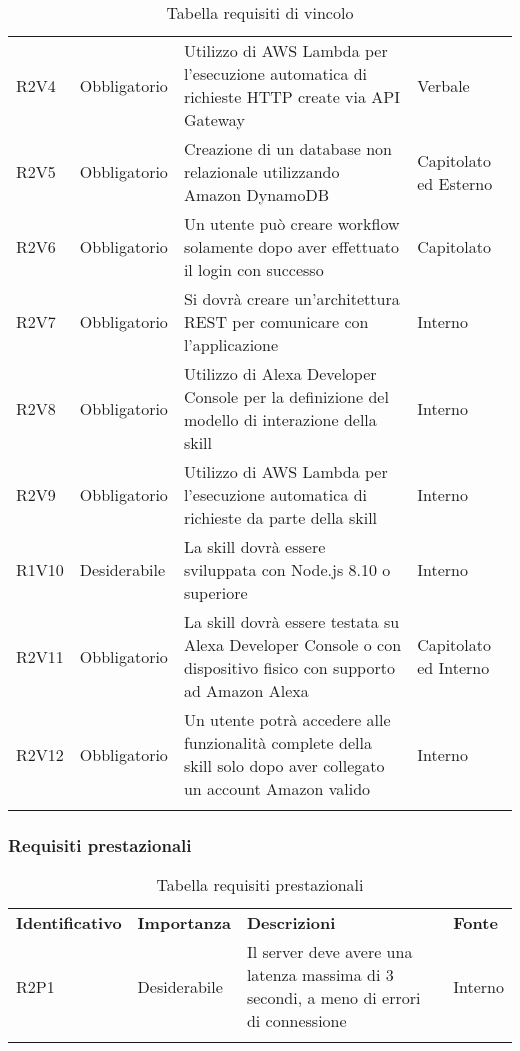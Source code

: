 \begin{center}
\begin{longtable}{  >{\RaggedRight}p{2.5cm}  
						>{\RaggedRight}p{2.1cm} 
						>{\RaggedRight}p{7cm}  
						>{\RaggedRight}p{1.7cm} 
						}
		R2V4   & Obbligatorio & Utilizzo di AWS Lambda per l'esecuzione automatica di richieste HTTP create via API Gateway                                                & Verbale               \\  
		R2V5   & Obbligatorio & Creazione di un database non relazionale utilizzando Amazon DynamoDB                                                                       & Capitolato ed Esterno \\  
		R2V6   & Obbligatorio & Un utente può creare workflow solamente dopo aver effettuato il login con successo                                                         & Capitolato            \\
		R2V7   & Obbligatorio & Si dovrà creare un'architettura REST per comunicare con l'applicazione                                                              & Interno    \\
		R2V8	& Obbligatorio & Utilizzo di  Alexa Developer Console per la definizione del modello di interazione della skill	& Interno \\
		R2V9	& Obbligatorio & Utilizzo di AWS Lambda per l'esecuzione automatica di richieste da parte della skill	& Interno \\
		R1V10	& Desiderabile & La skill dovrà essere sviluppata con Node.js 8.10 o superiore	& Interno \\
		R2V11	& Obbligatorio	& La skill dovrà essere testata su Alexa Developer Console o con dispositivo fisico con supporto ad Amazon Alexa	& Capitolato ed Interno \\
		R2V12	& Obbligatorio	& Un utente potrà accedere alle funzionalità complete della skill solo dopo aver collegato un account Amazon valido	& Interno \\
		
		\rowcolor{white}		
		\caption{Tabella requisiti di vincolo}
	\end{longtable}
\end{center}
\subsubsection{Requisiti prestazionali}
\begin{center}
	\renewcommand{\arraystretch}{1.5}
	\begin{longtable}{  >{\RaggedRight}p{2.5cm}  
						>{\RaggedRight}p{2.1cm} 
						>{\RaggedRight}p{7cm}  
						>{\RaggedRight}p{1.7cm} 
						}

		\rowcolor{tableHeadYellow}

		\textbf{Identificativo}   & \textbf{Importanza} & \textbf{Descrizioni} & \textbf{Fonte} \\ 

		R2P1 & Desiderabile & Il server deve avere una latenza massima di 3 secondi, a meno di errori di connessione                     & Interno \\  
		
		\rowcolor{white}
		\caption{Tabella requisiti prestazionali}
	\end{longtable}
\end{center}

